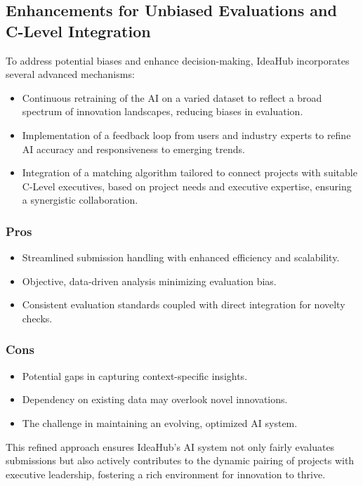 \documentclass{article}
\begin{document}
	\subsection{Enhancements for Unbiased Evaluations and C-Level Integration}
	To address potential biases and enhance decision-making, IdeaHub incorporates several advanced mechanisms:
	\begin{itemize}
		\item Continuous retraining of the AI on a varied dataset to reflect a broad spectrum of innovation landscapes, reducing biases in evaluation.
		\item Implementation of a feedback loop from users and industry experts to refine AI accuracy and responsiveness to emerging trends.
		\item Integration of a matching algorithm tailored to connect projects with suitable C-Level executives, based on project needs and executive expertise, ensuring a synergistic collaboration.
	\end{itemize}
	
	\subsubsection{Pros}
	\begin{itemize}
		\item Streamlined submission handling with enhanced efficiency and scalability.
		\item Objective, data-driven analysis minimizing evaluation bias.
		\item Consistent evaluation standards coupled with direct integration for novelty checks.
	\end{itemize}
	
	\subsubsection{Cons}
	\begin{itemize}
		\item Potential gaps in capturing context-specific insights.
		\item Dependency on existing data may overlook novel innovations.
		\item The challenge in maintaining an evolving, optimized AI system.
	\end{itemize}
	
	This refined approach ensures IdeaHub's AI system not only fairly evaluates submissions but also actively contributes to the dynamic pairing of projects with executive leadership, fostering a rich environment for innovation to thrive.
	
\end{document}
